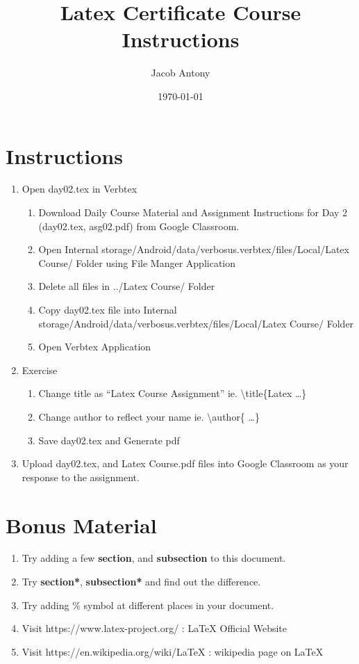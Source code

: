 \documentclass{article}
\title{Latex Certificate Course Instructions}
\author{Jacob Antony}
\date{\today}
\begin{document}
\maketitle

\section*{Instructions}

\begin{enumerate}
	\item Open day02.tex in Verbtex
	\begin{enumerate}
		\item Download Daily Course Material and Assignment Instructions for Day 2 (day02.tex, asg02.pdf) from Google Classroom.
		\item Open Internal storage/Android/data/verbosus.verbtex/files/Local/Latex Course/ Folder using File Manger Application
		\item Delete all files in ../Latex Course/ Folder
		\item Copy day02.tex file into Internal storage/Android/data/verbosus.verbtex/files/Local/Latex Course/  Folder
		\item Open Verbtex Application
	\end{enumerate}
	\item Exercise
	\begin{enumerate}
		\item Change title as ``Latex Course Assignment'' ie. \textbackslash{}title\{Latex \dots \}
		\item Change author to reflect your name ie. \textbackslash{}author\{ \dots \}
		\item Save day02.tex and Generate pdf
	\end{enumerate}
	\item Upload day02.tex, and Latex Course.pdf files into Google Classroom as your response to the assignment.
\end{enumerate}

\section{Bonus Material}

\begin{enumerate}
	\item Try adding a few \textbf{section}, and \textbf{subsection} to this document.
	\item Try \textbf{section*}, \textbf{subsection*} and find out the difference.
	\item Try adding \% symbol at different places in your document.
	\item Visit https://www.latex-project.org/ : \LaTeX{} Official Website
	\item Visit https://en.wikipedia.org/wiki/LaTeX : wikipedia page on \LaTeX{}
\end{enumerate}

%
%
\end{document}

